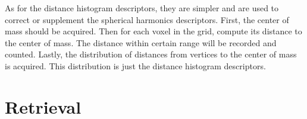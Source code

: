 As for the distance histogram descriptors, they are simpler and are used to correct or supplement the spherical harmonics descriptors. First, the center of mass should be acquired. Then for each voxel in the grid, compute its distance to the center of mass. The distance within certain range will be recorded and counted. Lastly, the 
distribution of distances from vertices to the center of mass is acquired. This distribution is just the distance histogram descriptors.  

\section{Retrieval}

